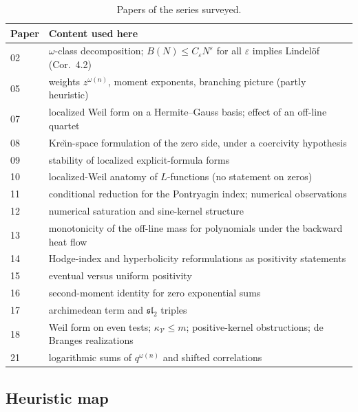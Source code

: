 \documentclass[11pt]{amsart}
\theoremstyle{definition}
\theoremstyle{remark}
\newcommand{\om}{\omega}
\newcommand{\eps}{\varepsilon}
\newcommand{\kV}{\kappa_{\mathcal V}}
\begin{document}
\begin{table}[h]
\small
\renewcommand{\arraystretch}{1.2}
\centering
\begin{tabularx}{\textwidth}{l>{\raggedright\arraybackslash}X}
\toprule
Paper & Content used here \\
\midrule
02 & $\om$-class decomposition; $B(N)\le C_\eps N^\eps$ for all $\eps$ implies Lindel\"of (Cor.~4.2) \\
05 & weights $z^{\om(n)}$, moment exponents, branching picture (partly heuristic) \\
07 & localized Weil form on a Hermite--Gauss basis; effect of an off-line quartet \\
08 & Kre\u\i n-space formulation of the zero side, under a coercivity hypothesis \\
09~\cite{P09} & stability of localized explicit-formula forms \\
10~\cite{P10} & localized-Weil anatomy of $L$-functions (no statement on zeros) \\
11 & conditional reduction for the Pontryagin index; numerical observations \\
12 & numerical saturation and sine-kernel structure \\
13 & monotonicity of the off-line mass for polynomials under the backward heat flow \\
14 & Hodge-index and hyperbolicity reformulations as positivity statements \\
15 & eventual versus uniform positivity \\
16 & second-moment identity for zero exponential sums \\
17 & archimedean term and $\mathfrak{sl}_2$ triples \\
18 & Weil form on even tests; $\kV\le m$; positive-kernel obstructions; de Branges realizations \\
21 & logarithmic sums of $q^{\om(n)}$ and shifted correlations \\
\bottomrule
\end{tabularx}
\caption{Papers of the series surveyed.}
\label{tab:timeline}
\end{table}

\subsection{Heuristic map}
\end{document}
